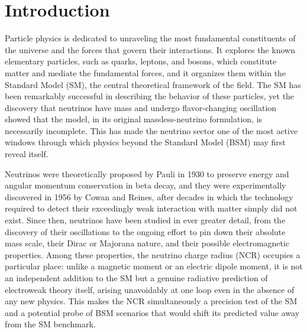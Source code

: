 \chapter{Introduction}
\label{chap:introduction}

Particle physics is dedicated to unraveling the most fundamental constituents of the universe and the forces that govern their interactions. It explores the known elementary particles, such as quarks, leptons, and bosons, which constitute matter and mediate the fundamental forces, and it organizes them within the Standard Model (SM), the central theoretical framework of the field. The SM has been remarkably successful in describing the behavior of these particles, yet the discovery that neutrinos have mass and undergo flavor-changing oscillation showed that the model, in its original massless-neutrino formulation, is necessarily incomplete. This has made the neutrino sector one of the most active windows through which physics beyond the Standard Model (BSM) may first reveal itself.

Neutrinos were theoretically proposed by Pauli in 1930 to preserve energy and angular momentum conservation in beta decay, and they were experimentally discovered in 1956 by Cowan and Reines, after decades in which the technology required to detect their exceedingly weak interaction with matter simply did not exist. Since then, neutrinos have been studied in ever greater detail, from the discovery of their oscillations to the ongoing effort to pin down their absolute mass scale, their Dirac or Majorana nature, and their possible electromagnetic properties. Among these properties, the neutrino charge radius (NCR) occupies a particular place: unlike a magnetic moment or an electric dipole moment, it is not an independent addition to the SM but a genuine radiative prediction of electroweak theory itself, arising unavoidably at one loop even in the absence of any new physics. This makes the NCR simultaneously a precision test of the SM and a potential probe of BSM scenarios that would shift its predicted value away from the SM benchmark.

